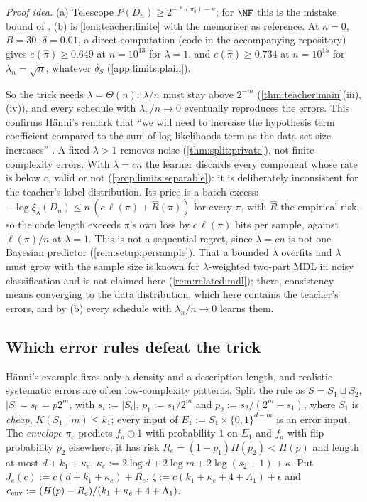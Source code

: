 \emph{Proof idea.} (a) Telescope $P(D_n)\ge2^{-\ell(\pi_b)-\kappa}$; for $\MF$ this is the mistake bound of \citet{claudeSFI2026fundamentals}. (b) is \cref{lem:teacher:finite} with the memoriser as reference. At $\kappa=0$, $B=30$, $\delta=0.01$, a direct computation (code in the accompanying repository) gives $e(\hat\pi)\ge0.649$ at $n=10^{13}$ for $\lambda=1$, and $e(\hat\pi)\ge0.734$ at $n=10^{15}$ for $\lambda_n=\sqrt n$, whatever $\delta_S$ (\cref{app:limits:plain}).

\begin{remark}\label{rem:limits:schedule}
So the trick needs $\lambda=\Theta(n)$: $\lambda/n$ must stay above $2^{-m}$ (\cref{thm:teacher:main}(iii),(iv)), and every schedule with $\lambda_n/n\to0$ eventually reproduces the errors. This confirms H\"anni's remark that ``we will need to increase the hypothesis term coefficient compared to the sum of log likelihoods term as the data set size increases'' \citep{hanni2026lesswrong}. A fixed $\lambda>1$ removes noise (\cref{thm:split:private}), not finite-complexity errors. With $\lambda=cn$ the learner discards every component whose rate is below $c$, valid or not (\cref{prop:limits:separable}): it is deliberately inconsistent for the teacher's label distribution. Its price is a batch excess: $-\log\xi_\lambda(D_n)\le n\,(c\,\ell(\pi)+\hat R(\pi))$ for every $\pi$, with $\hat R$ the empirical risk, so the code length exceeds $\pi$'s own loss by $c\,\ell(\pi)$ bits per sample, against $\ell(\pi)/n$ at $\lambda=1$. This is not a sequential regret, since $\lambda=cn$ is not one Bayesian predictor (\cref{rem:setup:persample}). That a bounded $\lambda$ overfits and $\lambda$ must grow with the sample size is known for $\lambda$-weighted two-part MDL in noisy classification \citep{zhu2025quantifying,zhu2026overfitting} and is not claimed here (\cref{rem:related:mdl}); there, consistency means converging to the data distribution, which here contains the teacher's errors, and by (b) every schedule with $\lambda_n/n\to0$ learns them.
\end{remark}

\subsection{Which error rules defeat the trick}\label{sec:limits:rules}

H\"anni's example fixes only a density and a description length, and realistic systematic errors are often low-complexity patterns. Split the rule as $S=S_1\sqcup S_2$, $|S|=s_0=p2^m$, with $s_i:=|S_i|$, $p_1:=s_1/2^m$ and $p_2:=s_2/(2^m-s_1)$, where $S_1$ is \emph{cheap}, $K(S_1\mid m)\le k_1$; every input of $E_1:=S_1\times\{0,1\}^{d-m}$ is an error input. The \emph{envelope} $\pi_e$ predicts $f_a\oplus1$ with probability $1$ on $E_1$ and $f_a$ with flip probability $p_2$ elsewhere; it has risk $R_e=(1-p_1)H(p_2)<H(p)$ and length at most $d+k_1+\kappa_e$, $\kappa_e:=2\log d+2\log m+2\log(s_2+1)+\kappa$. Put $J_e(c):=c(d+k_1+\kappa_e)+R_e$, $\zeta:=c(k_1+\kappa_e+4+\Lambda_1)+\epsilon$ and $c_{\rm env}:=(H(p)-R_e)/(k_1+\kappa_e+4+\Lambda_1)$.

